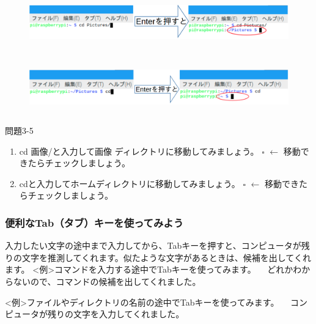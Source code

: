\documentclass[a4paper,dvipdfmx]{jarticle}
\begin{document}
\begin{figure}
\centering
\includegraphics[width=17.006cm,height=2.339cm]{text03-img/text03-img010.png}
\end{figure}
\begin{figure}
\centering
\includegraphics[width=16.715cm,height=2.286cm]{text03-img/text03-img011.png}
\end{figure}
{\ttfamily
問題3-5}

\begin{enumerate}
\item cd 画像/と入力して画像
ディレクトリに移動してみましょう。\newline
${\square}$ $\leftarrow $
移動できたらチェックしましょう。
\item
cdと入力してホームディレクトリに移動してみましょう。\newline
${\square}$ $\leftarrow $
移動できたらチェックしましょう。
\end{enumerate}
\subsubsection{}
\clearpage\subsubsection{便利なTab（タブ）キーを使ってみよう}
入力したい文字の途中まで入力してから、Tabキーを押すと、コンピュータが残りの文字を推測してくれます。似たような文字があるときは、候補を出してくれます。\newline
\newline
{\textless}例{\textgreater}コマンドを入力する途中でTabキーを使ってみます。\newline
\ \ どれかわからないので、コマンドの候補を出してくれました。

{\textless}例{\textgreater}ファイルやディレクトリの名前の途中でTabキーを使ってみます。\newline
\ \ コンピュータが残りの文字を入力してくれました。
\end{document}
